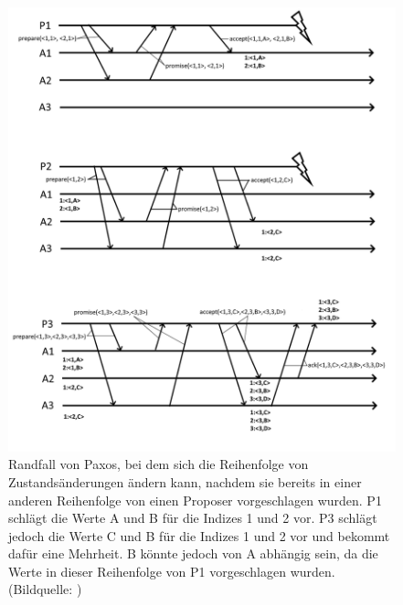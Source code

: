 \begin{figure}[p]
	\centering
	\includegraphics[width=\linewidth]{img/paxos_fail_2.png}
	\caption{Randfall von Paxos, bei dem sich die Reihenfolge von Zustandsänderungen ändern kann, nachdem sie bereits in einer anderen Reihenfolge von einen Proposer vorgeschlagen wurden. P1 schlägt die Werte A und B für die Indizes 1 und 2 vor. P3 schlägt jedoch die Werte C und B für die Indizes 1 und 2 vor und bekommt dafür eine Mehrheit. B könnte jedoch von A abhängig sein, da die Werte in dieser Reihenfolge von P1 vorgeschlagen wurden. (Bildquelle: \cite{zab})}
	\label{fig:paxos_fail}
\end{figure}

